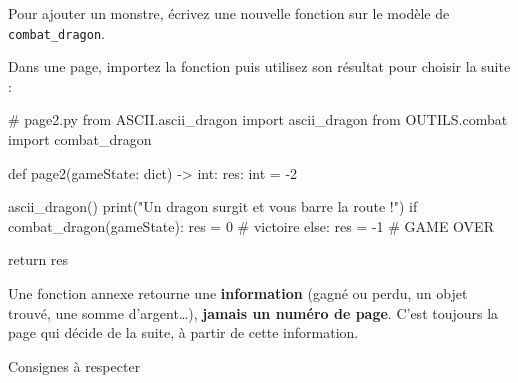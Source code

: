 \documentclass[11pt,a4paper]{article}
\makeatletter
\renewcommand\section{\@startsection{section}{1}{0pt}{1.6em}{0.8em}%
  {\Large\bfseries\color{nuit}}}
\makeatother
\begin{document}
Pour ajouter un monstre, écrivez une nouvelle fonction
sur le modèle de \texttt{combat\_dragon}.

Dans une page, importez la fonction puis utilisez son résultat
pour choisir la suite :

\begin{code}
# page2.py
from ASCII.ascii_dragon import ascii_dragon
from OUTILS.combat import combat_dragon


def page2(gameState: dict) -> int:
    res: int = -2

    ascii_dragon()
    print("Un dragon surgit et vous barre la route !")
    if combat_dragon(gameState):
        res = 0      # victoire
    else:
        res = -1     # GAME OVER

    return res
\end{code}

\begin{attention}
Une fonction annexe retourne une \textbf{information} (gagné ou perdu, un objet
trouvé, une somme d'argent\dots), \textbf{jamais un numéro de page}. C'est toujours la
page qui décide de la suite, à partir de cette information.
\end{attention}

\newpage
\section{Consignes à respecter}\label{sec:consignes}
\end{document}
